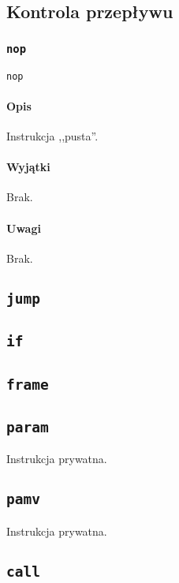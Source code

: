 \subsection{Kontrola przepływu}
\label{viua_vm_ops_control_flow}

\subsubsection{\texttt{nop}}

\begin{lstlisting}
nop
\end{lstlisting}

\paragraph*{Opis} Instrukcja ,,pusta''.

\paragraph*{Wyjątki} Brak.

\paragraph*{Uwagi} Brak.

\subsection{\texttt{jump}}
\subsection{\texttt{if}}

\subsection{\texttt{frame}}
\subsection{\texttt{param}}

Instrukcja prywatna.

\subsection{\texttt{pamv}}

Instrukcja prywatna.

\subsection{\texttt{call}}

